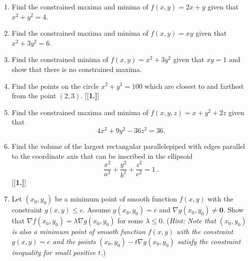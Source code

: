 \startexercises\label{sec2dot7}
\begin{enumerate}[\bfseries 1.]
 \item Find the constrained maxima and minima of $f(x,y) = 2x+y$ given that $x^2 + y^2 =4$.
 \item Find the constrained maxima and minima of $f(x,y) = xy$ given that $x^2 + 3y^2 =6$.
 \item Find the constrained minima of $f(x,y) = x^2 + 3y^2$ given that $xy =1$ and show that there is no constrained maxima.
 \item Find the points on the circle $x^2 + y^2 = 100$ which are closest to and farthest from the point $(2,3)$.
[{[\bfseries 1.]}]
 \item Find the constrained maxima and minima of $f(x,y,z) = x+y^2 +2z$ given that 
 \[4x^2 + 9y^2 -36z^2 =36.\]
 \item Find the volume of the largest rectangular parallelepiped with edges parallel to the coordinate axis that can be inscribed in the ellipsoid
  \begin{displaymath}
   \frac{x^2}{a^2} + \frac{y^2}{b^2} + \frac{z^2}{c^2} = 1 ~.
  \end{displaymath}
[{[\bfseries 1.]}]
\item Let $(x_0,y_0)$ be a minimum point of smooth function $f(x,y)$ with the constraint $g(x,y)\le c$.
Assume $g(x_0,y_0)=c$ and $\nabla g(x_0,y_0)\ne \textbf{0}$.
Show that  
$\nabla f(x_0,y_0)=\lambda \nabla g(x_0,y_0)$
for some $\lambda\le 0$. 
(\emph{Hint: Note that $(x_0,y_0)$ is also a minimum point of smooth function $f(x,y)$ with the constraint $g(x,y)=c$ and the points $(x_0,y_0)-t\nabla g(x_0,y_0)$ satisfy the constraint inequality for small positive $t$.})

\end{enumerate}
